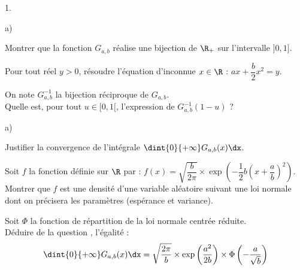 \begin{noliste}{1.}
\item
  \begin{noliste}{a)}
    \setlength{\itemsep}{2mm}
  \item Montrer que la fonction $G_{a,b}$ réalise une bijection de
    $\R_+$ sur l'intervalle $]0,1]$.
    
    
    



  \item Pour tout réel $y>0$, résoudre l'équation d'inconnue $x\in\R$
    : $ax + \dfrac{b}{2} x^2 = y$.

    

  \item On note $G_{a,b}^{-1}$ la bijection réciproque de
    $G_{a,b}$. \\
    Quelle est, pour tout $u\in[0,1[$, l'expression de
    $G_{a,b}^{-1}(1-u)$ ?

    
  \end{noliste}




\item
  \begin{noliste}{a)}
    \setlength{\itemsep}{2mm}
  \item Justifier la convergence de l'intégrale $\dint{0}{+\infty}
    G_{a,b}(x)\dx$.

    

  \item Soit $f$ la fonction définie sur $\R$ par : $f(x) =
    \sqrt{\dfrac{b}{2\pi}}\times \exp \left(-\dfrac{1}{2} b
      \left(x+\dfrac{a}{b}\right)^2 \right)$.\\
    Montrer que $f$ est une densité d'une variable aléatoire suivant
    une loi normale dont on précisera les paramètres (espérance et
    variance).

    




  \item Soit $\Phi$ la fonction de répartition de la loi normale
    centrée réduite. \\
    Déduire de la question , l'égalité :
    \[
    \dint{0}{+\infty} G_{a,b}(x)\dx = \sqrt{\frac{2\pi}{b}}\times
    \exp\left(\frac{a^2}{2b}\right) \times
    \Phi\left(-\frac{a}{\sqrt{b}}\right)
    \]

    
  \end{noliste}


\end{noliste}
